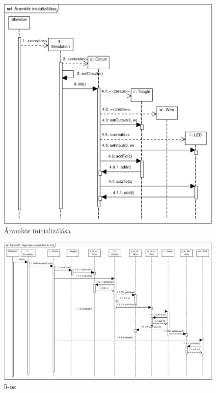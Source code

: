 \begin{figure}[H]
\begin{center}
\includegraphics[width=17cm]{chapters/chapter05/imgs/init.pdf}
\caption{Áramkör inicializálása}
\label{fig:init}
\end{center}
\end{figure}

\begin{figure}[H]
\begin{center}
\includegraphics[angle=90,width=15cm]{chapters/chapter05/imgs/test5.pdf}
\caption{5-ös}
\label{fig:init}
\end{center}
\end{figure}
